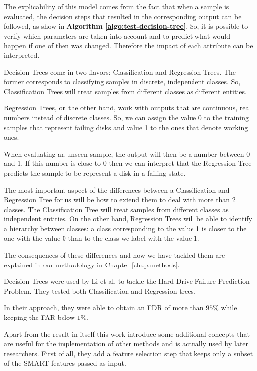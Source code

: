 The explicability of this model comes from the fact that when a sample is evaluated, the decision steps that resulted in the corresponding output can be followed, as show in \textbf{Algorithm \ref{algo:test-decision-tree}}.
So, it is possible to verify which parameters are taken into account and to predict what would happen if one of then was changed.
Therefore the impact of each attribute can be interpreted.

Decision Trees come in two flavors: Classification and Regression Trees.
The former corresponds to classifying samples in discrete, independent classes.
So, Classification Trees will treat samples from different classes as different entities.

Regression Trees, on the other hand, work with outputs that are continuous, real numbers instead of discrete classes.
So, we can assign the value 0 to the training samples that represent failing disks and value 1 to the ones that denote working ones.

When evaluating an unseen sample, the output will then be a number between 0 and 1.
If this number is close to 0 then we can interpret that the Regression Tree predicts the sample to be represent a disk in a failing state. 

The most important aspect of the differences between a Classification and Regression Tree for us will be how to extend them to deal with more than 2 classes.
The Classification Tree will treat samples from different classes as independent entities.
On the other hand, Regression Trees will be able to identify a hierarchy between classes: a class corresponding to the value 1 is closer to the one with the value 0 than to the class we label with the value 1.

The consequences of these differences and how we have tackled them are explained in our methodology in Chapter \ref{chap:methods}.

Decision Trees were used by Li et al. \cite{Li14} to tackle the Hard Drive Failure Prediction Problem.
They tested both Classification and Regression trees.

In their approach, they were able to obtain an FDR of more than $95\%$ while keeping the FAR below $1\%$.

Apart from the result in itself this work introduce some additional concepts that are useful for the implementation of other methods and is actually used by later researchers.
First of all, they add a feature selection step that keeps only a subset of the SMART features passed as input.

